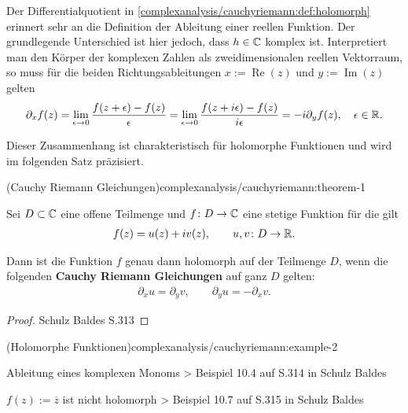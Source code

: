 \par
Der Differentialquotient in \cref{complexanalysis/cauchyriemann:def:holomorph} erinnert sehr an die Definition der Ableitung einer reellen Funktion.
Der grundlegende Unterschied ist hier jedoch, dass \(h \in \mathbb{C}\) komplex ist.
Interpretiert man den Körper der komplexen Zahlen als zweidimensionalen reellen Vektorraum, so muss für die beiden Richtungsableitungen \(x := \operatorname{Re}(z)\) und \(y := \operatorname{Im}(z)\) gelten
\begin{align*}
\partial_x f(z) = \lim_{\epsilon \rightarrow 0} \frac{f(z+\epsilon) - f(z)}{\epsilon} = \lim_{\epsilon \rightarrow 0} \frac{f(z+i\epsilon) - f(z)}{i\epsilon} = -i \partial_y f(z), \quad \epsilon \in \mathbb{R}.
\end{align*}
\par
Dieser Zusammenhang ist charakteristisch für holomorphe Funktionen und wird im folgenden Satz präzisiert.
\begin{theorem}{(Cauchy Riemann Gleichungen)}{complexanalysis/cauchyriemann:theorem-1}



\par
Sei \(D \subset \mathbb{C}\) eine offene Teilmenge und \(f \colon D \rightarrow \mathbb{C}\) eine stetige Funktion für die gilt
\begin{align*}
f(z) = u(z) + i v(z), \qquad u,v \colon D \rightarrow \mathbb{R}.
\end{align*}
\par
Dann ist die Funktion \(f\) genau dann holomorph auf der Teilmenge \(D\), wenn die folgenden \textbf{Cauchy Riemann Gleichungen} auf ganz \(D\) gelten:
\begin{align*}
\partial_x u = \partial_y v, \qquad \partial_y u = -\partial_x v.
\end{align*}\end{theorem}

\begin{proof}
 Schulz Baldes S.313
\end{proof}
\begin{example}{(Holomorphe Funktionen)}{complexanalysis/cauchyriemann:example-2}



\par
Ableitung eines komplexen Monoms  > Beispiel 10.4 auf S.314 in Schulz Baldes

\par
\(f(z) := \overline{z}\) ist nicht holomorph  > Beispiel 10.7 auf S.315 in Schulz Baldes
\end{example}

